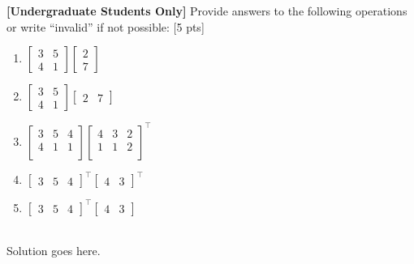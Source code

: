 \textbf{[Undergraduate Students Only]} Provide answers to the following operations or write ``invalid'' if not possible: [5 pts]
\begin{enumerate}
    \item $\begin{bmatrix} 
                3 & 5 \\
                4 & 1 
           \end{bmatrix}
           \begin{bmatrix} 
                2  \\
                7 
            \end{bmatrix}
           $  
    \item $\begin{bmatrix} 
                3 & 5 \\
                4 & 1 
           \end{bmatrix}
           \begin{bmatrix} 
                2  & 7
            \end{bmatrix}
           $  
     \item $\begin{bmatrix} 
                3 & 5 & 4\\
                4 & 1 & 1\\
           \end{bmatrix}
           \begin{bmatrix} 
                4 & 3 & 2\\
                1 & 1 & 2\\
            \end{bmatrix}^{\intercal}
           $  
    \item $\begin{bmatrix} 
                3 & 5 & 4
           \end{bmatrix}^{\intercal}
           \begin{bmatrix} 
                4 & 3
            \end{bmatrix}^{\intercal}
           $  
    \item $\begin{bmatrix} 
                3 & 5 & 4
           \end{bmatrix}^{\intercal}
           \begin{bmatrix} 
                4 & 3
            \end{bmatrix}
           $  
\end{enumerate}

\begin{solution} \ \\
Solution goes here.
\end{solution}